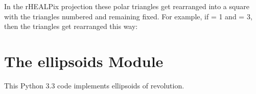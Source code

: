\documentclass[a4paper,12ptopenany,oneside,english]{sphinxmanual}
\begin{document}
\begin{fulllineitems}
\sphinxAtStartPar
In the rHEALPix projection these polar triangles get rearranged
into a square with the triangles numbered  and 
remaining fixed.
For example, if  = 1 and  = 3,
then the triangles get rearranged this way:

\begin{sphinxVerbatim}[commandchars=\\\{\}]
       
                            
                            
                            

   
                            
                            
                            
\end{sphinxVerbatim}

\end{fulllineitems}


\sphinxstepscope


\chapter{The ellipsoids Module}
\label{\detokenize{ellipsoids:module-rhealpixdggs.ellipsoids}}\label{\detokenize{ellipsoids:the-ellipsoids-module}}\label{\detokenize{ellipsoids::doc}}
\sphinxAtStartPar
This Python 3.3 code implements ellipsoids of revolution.
\end{document}
